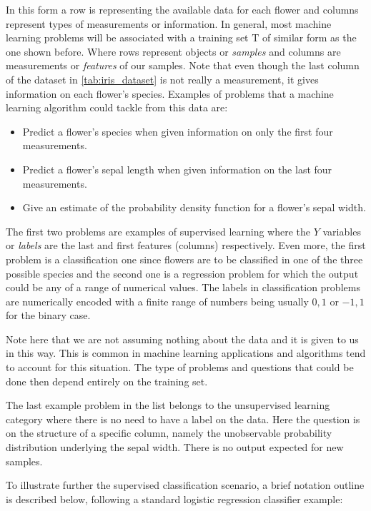 In this form a row is representing the available data for each flower and columns represent types of measurements or information. In general, most machine learning problems will be associated with a training set  $\mathrm{T}$ of similar form as the one shown before. Where rows represent objects or \textit{samples} and columns are measurements or \textit{features} of our samples. Note that even though the last column of the dataset in \ref{tab:iris_dataset} is not really a measurement, it gives information on each flower's species. Examples of problems that a machine learning algorithm could tackle from this data are: 

\begin{itemize}
	\item Predict a flower's species when given information on only the first four measurements.
	\item Predict a flower's sepal length when given information on the last four measurements.
	\item Give an estimate of the probability density function for a flower's sepal width.
\end{itemize}

The first two problems are examples of supervised learning where the $Y$ variables or \textit{labels} are the last and first features (columns) respectively. Even more, the first problem is a classification one since flowers are to be classified in one of the three possible species and the second one is a regression problem for which the output could be any of a range of numerical values. The labels in classification problems are numerically encoded with a finite range of numbers being usually ${0,1}$ or ${-1,1}$ for the binary case.

Note here that we are not assuming nothing about the data and it is given to us in this way. This is common in machine learning applications and algorithms tend to account for this situation. The type of problems and questions that could be done then depend entirely on the training set. 

The last example problem in the list belongs to the unsupervised learning category where there is no need to have a label on the data. Here the question is on the structure of a specific column, namely the unobservable probability distribution underlying the sepal width. There is no output expected for new samples.

To illustrate further the supervised classification scenario, a brief notation outline is described below, following a standard logistic regression classifier example:

